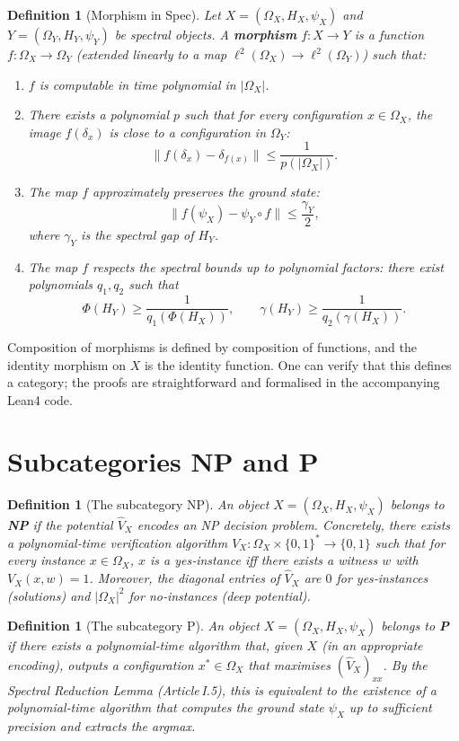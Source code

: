 \documentclass[11pt,a4paper]{article}
\newtheorem{definition}[theorem]{Definition}
\begin{document}
\begin{definition}[Morphism in Spec]
Let $X = (\Omega_X, H_X, \psi_X)$ and $Y = (\Omega_Y, H_Y, \psi_Y)$ be spectral objects. A \textbf{morphism} $f: X \to Y$ is a function $f: \Omega_X \to \Omega_Y$ (extended linearly to a map $\ell^2(\Omega_X) \to \ell^2(\Omega_Y)$) such that:
\begin{enumerate}
\item $f$ is computable in time polynomial in $|\Omega_X|$.
\item There exists a polynomial $p$ such that for every configuration $x \in \Omega_X$, the image $f(\delta_x)$ is close to a configuration in $\Omega_Y$:
   \[
   \| f(\delta_x) - \delta_{f(x)} \| \le \frac{1}{p(|\Omega_X|)}.
   \]
\item The map $f$ approximately preserves the ground state:
   \[
   \| f(\psi_X) - \psi_Y \circ f \| \le \frac{\gamma_Y}{2},
   \]
   where $\gamma_Y$ is the spectral gap of $H_Y$.
\item The map $f$ respects the spectral bounds up to polynomial factors: there exist polynomials $q_1, q_2$ such that
   \[
   \Phi(H_Y) \ge \frac{1}{q_1(\Phi(H_X))},\qquad \gamma(H_Y) \ge \frac{1}{q_2(\gamma(H_X))}.
   \]
\end{enumerate}
\end{definition}

Composition of morphisms is defined by composition of functions, and the identity morphism on $X$ is the identity function. One can verify that this defines a category; the proofs are straightforward and formalised in the accompanying Lean4 code.

\section{Subcategories NP and P}

\begin{definition}[The subcategory NP]
An object $X = (\Omega_X, H_X, \psi_X)$ belongs to \textbf{NP} if the potential $\hat{V}_X$ encodes an NP decision problem. Concretely, there exists a polynomial‑time verification algorithm $V_X: \Omega_X \times \{0,1\}^* \to \{0,1\}$ such that for every instance $x \in \Omega_X$, $x$ is a yes‑instance iff there exists a witness $w$ with $V_X(x,w) = 1$. Moreover, the diagonal entries of $\hat{V}_X$ are $0$ for yes‑instances (solutions) and $|\Omega_X|^2$ for no‑instances (deep potential).
\end{definition}

\begin{definition}[The subcategory P]
An object $X = (\Omega_X, H_X, \psi_X)$ belongs to \textbf{P} if there exists a polynomial‑time algorithm that, given $X$ (in an appropriate encoding), outputs a configuration $x^* \in \Omega_X$ that maximises $(\hat{V}_X)_{xx}$. By the Spectral Reduction Lemma (Article I.5), this is equivalent to the existence of a polynomial‑time algorithm that computes the ground state $\psi_X$ up to sufficient precision and extracts the argmax.
\end{definition}
\end{document}
